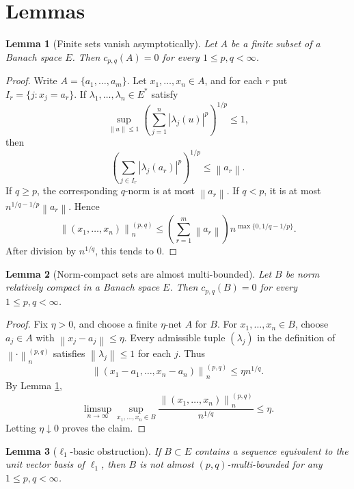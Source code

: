 \documentclass[11pt]{article}
\newtheorem{lemma}{Lemma}
\newcommand{\norm}[1]{\left\lVert #1 \right\rVert}
\begin{document}
\section*{Lemmas}

\begin{lemma}[Finite sets vanish asymptotically]
\label{lem:finite}
Let \(A\) be a finite subset of a Banach space \(E\).  Then
\(c_{p,q}(A)=0\) for every \(1\le p,q<\infty\).
\end{lemma}

\begin{proof}
Write \(A=\{a_1,\ldots,a_m\}\).  Let \(x_1,\ldots,x_n\in A\), and for each
\(r\) put \(I_r=\{j:x_j=a_r\}\).  If
\(\lambda_1,\ldots,\lambda_n\in E^*\) satisfy
\[
  \sup_{\norm{u}\le 1}\left(\sum_{j=1}^n|\lambda_j(u)|^p\right)^{1/p}\le 1,
\]
then
\[
  \left(\sum_{j\in I_r}|\lambda_j(a_r)|^p\right)^{1/p}\le \norm{a_r}.
\]
If \(q\ge p\), the corresponding \(q\)-norm is at most \(\norm{a_r}\).  If
\(q<p\), it is at most
\(n^{1/q-1/p}\norm{a_r}\).  Hence
\[
  \norm{(x_1,\ldots,x_n)}^{(p,q)}_n
  \le
  \left(\sum_{r=1}^m \norm{a_r}\right)n^{\max\{0,1/q-1/p\}}.
\]
After division by \(n^{1/q}\), this tends to \(0\).
\end{proof}

\begin{lemma}[Norm-compact sets are almost multi-bounded]
\label{lem:compact}
Let \(B\) be norm relatively compact in a Banach space \(E\).  Then
\(c_{p,q}(B)=0\) for every \(1\le p,q<\infty\).
\end{lemma}

\begin{proof}
Fix \(\eta>0\), and choose a finite \(\eta\)-net \(A\) for \(B\).  For
\(x_1,\ldots,x_n\in B\), choose \(a_j\in A\) with \(\norm{x_j-a_j}\le \eta\).
Every admissible tuple \((\lambda_j)\) in the definition of
\(\norm{\cdot}^{(p,q)}_n\) satisfies \(\norm{\lambda_j}\le 1\) for each \(j\).
Thus
\[
  \norm{(x_1-a_1,\ldots,x_n-a_n)}^{(p,q)}_n\le \eta n^{1/q}.
\]
By Lemma \ref{lem:finite},
\[
  \limsup_{n\to\infty}\sup_{x_1,\ldots,x_n\in B}
  \frac{\norm{(x_1,\ldots,x_n)}^{(p,q)}_n}{n^{1/q}}\le \eta.
\]
Letting \(\eta\downarrow 0\) proves the claim.
\end{proof}

\begin{lemma}[\(\ell_1\)-basic obstruction]
\label{lem:l1}
If \(B\subset E\) contains a sequence equivalent to the unit vector basis of
\(\ell_1\), then \(B\) is not almost \((p,q)\)-multi-bounded for any
\(1\le p,q<\infty\).
\end{lemma}
\end{document}
